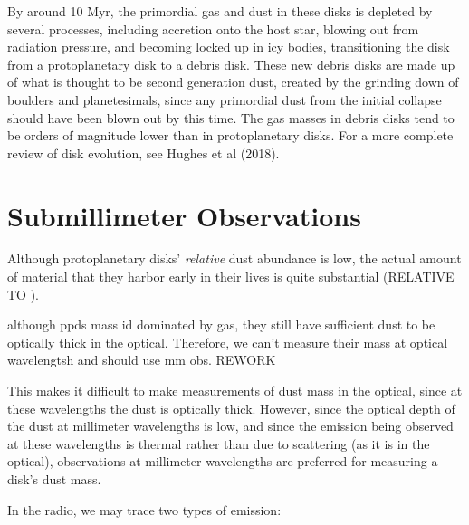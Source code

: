 \iffalse
The dissipation of gas is one of several criteria for classifying something as a protoplanetary vs. debris disk, and furthermore, we actually know very little about gas dissipation, and the 10 Myr timescale is based on dust observations rather than gas… Maybe edit this sentence to something more along the lines of “By around 10 Myr, the primordial gas and dust in these disks is depleted by several processes, including … [end sentence].  The gas-poor, optically thin dust disk containing the planetary system is then known as a debris disk.    
\fi

By around 10 Myr, the primordial gas and dust in these disks is depleted by several processes, including accretion onto the host star, blowing out from radiation pressure, and becoming locked up in icy bodies, transitioning the disk from a protoplanetary disk to a debris disk. These new debris disks are made up of what is thought to be second generation dust, created by the grinding down of boulders and planetesimals, since any primordial dust from the initial collapse should have been blown out by this time. The gas masses in debris disks tend to be orders of magnitude lower than in protoplanetary disks. For a more complete review of disk evolution, see Hughes et al (2018).




\section{Submillimeter Observations}

Although protoplanetary disks' \textit{relative} dust abundance is low, the actual amount of material that they harbor early in their lives is quite substantial (RELATIVE TO ).

although ppds mass id dominated by gas, they still have sufficient dust to be optically thick in the optical. Therefore, we can't measure their mass at optical wavelengtsh and should use mm obs. REWORK

This makes it difficult to make measurements of dust mass in the optical, since at these wavelengths the dust is optically thick. However, since the optical depth of the dust at millimeter wavelengths is low, and since the emission being observed at these wavelengths is thermal rather than due to scattering (as it is in the optical), observations at millimeter wavelengths are preferred for measuring a disk's dust mass.


In the radio, we may trace two types of emission:

